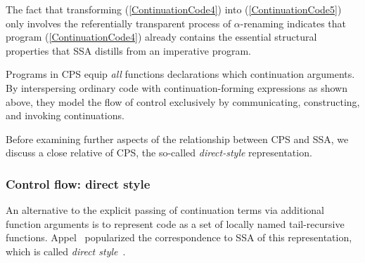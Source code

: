  The fact that transforming (\ref{ContinuationCode4}) into
(\ref{ContinuationCode5}) only involves the referentially transparent
process of $\alpha$-renaming indicates that program
(\ref{ContinuationCode4}) already contains the essential structural
properties that SSA distills from an imperative program.

Programs in CPS equip \emph{all} functions declarations which
continuation arguments. By interspersing ordinary code with
continuation-forming expressions as shown above, they model the flow
of control exclusively by communicating, constructing, and invoking
continuations.

Before examining further aspects of the relationship between CPS and
SSA, we discuss a close relative of CPS, the so-called
\emph{direct-style} representation.


\subsubsection{Control flow: direct style}

An alternative to the explicit passing of continuation terms via
additional function arguments is to represent code as a set of locally
named tail-recursive functions. Appel~\cite{Appel98:SSA} popularized
the correspondence to SSA of this representation, which is called
\emph{direct style}~\cite{Reynolds1974}.

